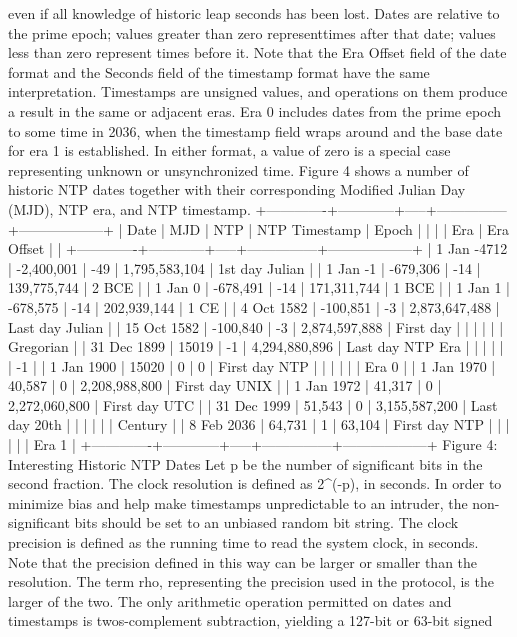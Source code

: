  even if all knowledge of historic leap seconds has been lost. Dates
 are relative to the prime epoch; values greater than zero representtimes after that date; values less than zero represent times before
 it. Note that the Era Offset field of the date format and the
 Seconds field of the timestamp format have the same interpretation.
 Timestamps are unsigned values, and operations on them produce a
 result in the same or adjacent eras. Era 0 includes dates from the
 prime epoch to some time in 2036, when the timestamp field wraps
 around and the base date for era 1 is established. In either format,
 a value of zero is a special case representing unknown or
 unsynchronized time. Figure 4 shows a number of historic NTP dates
 together with their corresponding Modified Julian Day (MJD), NTP era,
 and NTP timestamp.
 +-------------+------------+-----+---------------+------------------+
 | Date | MJD | NTP | NTP Timestamp | Epoch |
 | | | Era | Era Offset | |
 +-------------+------------+-----+---------------+------------------+
 | 1 Jan -4712 | -2,400,001 | -49 | 1,795,583,104 | 1st day Julian |
 | 1 Jan -1 | -679,306 | -14 | 139,775,744 | 2 BCE |
 | 1 Jan 0 | -678,491 | -14 | 171,311,744 | 1 BCE |
 | 1 Jan 1 | -678,575 | -14 | 202,939,144 | 1 CE |
 | 4 Oct 1582 | -100,851 | -3 | 2,873,647,488 | Last day Julian |
 | 15 Oct 1582 | -100,840 | -3 | 2,874,597,888 | First day |
 | | | | | Gregorian |
 | 31 Dec 1899 | 15019 | -1 | 4,294,880,896 | Last day NTP Era |
 | | | | | -1 |
 | 1 Jan 1900 | 15020 | 0 | 0 | First day NTP |
 | | | | | Era 0 |
 | 1 Jan 1970 | 40,587 | 0 | 2,208,988,800 | First day UNIX |
 | 1 Jan 1972 | 41,317 | 0 | 2,272,060,800 | First day UTC |
 | 31 Dec 1999 | 51,543 | 0 | 3,155,587,200 | Last day 20th |
 | | | | | Century |
 | 8 Feb 2036 | 64,731 | 1 | 63,104 | First day NTP |
 | | | | | Era 1 |
 +-------------+------------+-----+---------------+------------------+
 Figure 4: Interesting Historic NTP Dates
 Let p be the number of significant bits in the second fraction. The
 clock resolution is defined as 2^(-p), in seconds. In order to
 minimize bias and help make timestamps unpredictable to an intruder,
 the non-significant bits should be set to an unbiased random bit
 string. The clock precision is defined as the running time to read
 the system clock, in seconds. Note that the precision defined in
 this way can be larger or smaller than the resolution. The term rho,
 representing the precision used in the protocol, is the larger of the
 two.
The only arithmetic operation permitted on dates and timestamps is
 twos-complement subtraction, yielding a 127-bit or 63-bit signed
